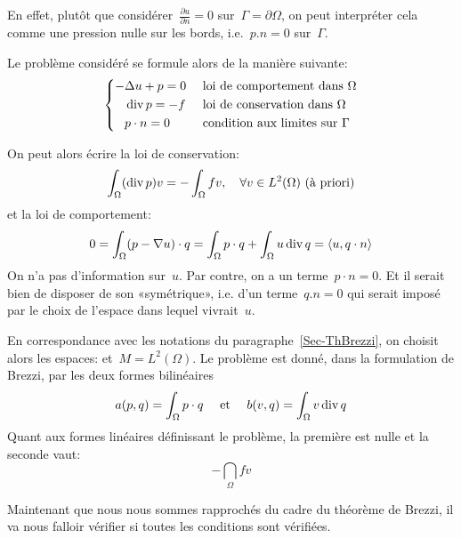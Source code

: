 En effet, plutôt que considérer~$\frac{\partial u}{\partial n}=0$ sur~$\Gamma=\partial\Omega$, on peut interpréter cela comme une pression nulle sur les bords, i.e.~$p.n=0$ sur~$\Gamma$.

\medskip
Le problème considéré se formule alors de la manière suivante:
\begin{equation}\left\{
\begin{aligned}
-&\Delta u +p =0 && \text{ loi de comportement dans } \Omega\\
&\operatorname{div} p = -f && \text{ loi de conservation dans } \Omega\\
& p\cdot n=0 && \text{ condition aux limites sur }\Gamma
\end{aligned}
\right.
\end{equation}

On peut alors écrire la loi de conservation:
\begin{equation}
\displaystyle\int_\Omega (\operatorname{div} p) v = -\displaystyle\int_\Omega fv,\quad \forall v\in L^2(\Omega) \text{ (à priori)}
\end{equation}
et la loi de comportement:
\begin{equation}
0=\displaystyle\int_\Omega (p-\nabla u)\cdot q = \displaystyle\int_\Omega p\cdot q + \displaystyle\int_\Omega u \operatorname{div} q=\langle u,q\cdot n\rangle
\end{equation}
On n'a pas d'information sur~$u$. Par contre, on a un terme~$p\cdot n=0$. Et il serait bien de disposer de son «symétrique», i.e. d'un terme~$q.n=0$ qui serait imposé par le choix de l'espace dans lequel vivrait~$u$. 

\medskip
En correspondance avec les notations du paragraphe~\ref{Sec-ThBrezzi}, on choisit alors les espaces:  et~$M=L^2(\Omega)$. Le problème est donné, dans la formulation de Brezzi, par les deux formes bilinéaires
\begin{equation}a(p,q)=\displaystyle\int_\Omega p\cdot q\quad\text{ et }\quad b(v,q)=\displaystyle\int_\Omega v\operatorname{div} q\end{equation}
Quant aux formes linéaires définissant le problème, la première est nulle et la seconde vaut:\begin{equation}-\dint_\Omega fv\end{equation}

\medskip
Maintenant que nous nous sommes rapprochés du cadre du théorème de Brezzi, il va nous falloir vérifier si toutes les conditions sont vérifiées. 

